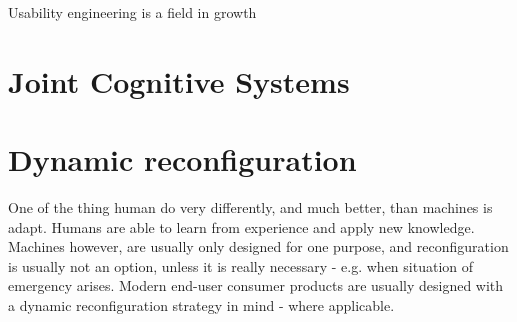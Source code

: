 \documentclass[10pt,oneside]{book}                  %
\begin{document}
Usability engineering is a field in growth

\section{Joint Cognitive Systems}
\cite{hollnagel1983cognitive}


\section{Dynamic reconfiguration}
One of the thing human do very differently, and much better, than machines is adapt. Humans are able to learn from experience and apply new knowledge. Machines however, are usually only designed for one purpose, and reconfiguration is usually not an option, unless it is really necessary - e.g. when situation of emergency arises.
Modern end-user consumer products are usually designed with a dynamic reconfiguration strategy in mind - where applicable.
\end{document}
